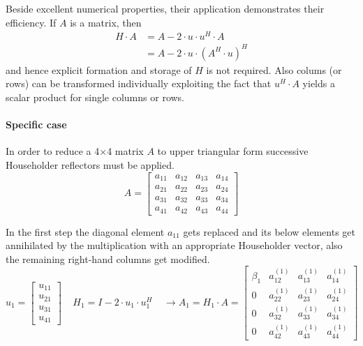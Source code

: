 Beside excellent numerical properties, their application demonstrates
their efficiency.  If $A$ is a matrix, then
\begin{align}
H\cdot A &= A - 2\cdot u\cdot u^H\cdot A\\
\nonumber
&=  A - 2\cdot u\cdot \left(A^H\cdot u\right)^H
\end{align}
and hence explicit formation and storage of $H$ is not required.  Also
colums (or rows) can be transformed individually exploiting the fact
that $u^H\cdot A$ yields a scalar product for single columns or rows.

\paragraph{Specific case}

In order to reduce a 4$\times$4 matrix $A$ to upper triangular form
successive Householder reflectors must be applied.
\begin{equation}
A =
\begin{bmatrix}
a_{11} & a_{12} & a_{13} & a_{14}\\
a_{21} & a_{22} & a_{23} & a_{24}\\
a_{31} & a_{32} & a_{33} & a_{34}\\
a_{41} & a_{42} & a_{43} & a_{44}
\end{bmatrix}
\end{equation}

In the first step the diagonal element $a_{11}$ gets replaced and its
below elements get annihilated by the multiplication with an
appropriate Householder vector, also the remaining right-hand columns
get modified.
\begin{equation}
u_1 =
\begin{bmatrix}
u_{11}\\
u_{21}\\
u_{31}\\
u_{41}
\end{bmatrix}
\;\;\;\;
H_1 = I - 2\cdot u_1\cdot u_1^H
\;\;\;\;
\rightarrow A_1 = H_1\cdot A =
\begin{bmatrix}
\beta_1 & a_{12}^{(1)} & a_{13}^{(1)} & a_{14}^{(1)}\\
0 & a_{22}^{(1)} & a_{23}^{(1)} & a_{24}^{(1)}\\
0 & a_{32}^{(1)} & a_{33}^{(1)} & a_{34}^{(1)}\\
0 & a_{42}^{(1)} & a_{43}^{(1)} & a_{44}^{(1)}
\end{bmatrix}
\end{equation}

